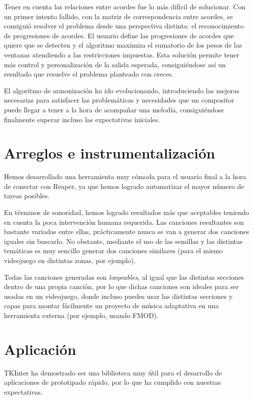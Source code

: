 Tener en cuenta las relaciones entre acordes fue lo más difícil de solucionar. Con un primer intento fallido, con la matriz de correspondencia entre acordes, se consiguió resolver el problema desde una perspectiva distinta: el reconocimiento de progresiones de acordes. El usuario define las progresiones de acordes que quiere que se detecten y el algoritmo maximiza el sumatorio de los pesos de las ventanas atendiendo a las restricciones impuestas. Esta solución permite tener más control y personalización de la salida esperada, consiguiéndose así un resultado que resuelve el problema planteado con creces.

El algoritmo de armonización ha ido evolucionando, introduciendo las mejoras necesarias para satisfacer las problemáticas y necesidades que un compositor puede llegar a tener a la hora de acompañar una melodía, consiguiéndose finalmente superar incluso las expectativas iniciales.

\section{Arreglos e instrumentalización}

Hemos desarrollado una herramienta muy cómoda para el usuario final a la hora de conectar con Reaper, ya que hemos logrado automatizar el mayor número de tareas posibles.

En términos de sonoridad, hemos logrado resultados más que aceptables teniendo en cuenta la poca intervención humana requerida. Las canciones resultantes son bastante variadas entre ellas, prácticamente nunca se van a generar dos canciones iguales sin buscarlo. No obstante, mediante el uso de las semillas y las distintas temáticas es muy sencillo generar dos canciones similares (para el mismo videojuego en distintas zonas, por ejemplo).

Todas las canciones generadas son \textit{loopeables}, al igual que las distintas secciones dentro de una propia canción, por lo que dichas canciones son ideales para ser usadas en un videojuego, donde incluso puedes usar las distintas secciones y capas para montar fácilmente un proyecto de música adaptativa en una herramienta externa (por ejemplo, usando FMOD).

\section{Aplicación}
TKInter ha demostrado ser una biblioteca muy útil para el desarrollo de aplicaciones de prototipado rápido, por lo que ha cumplido con nuestras expectativas.

